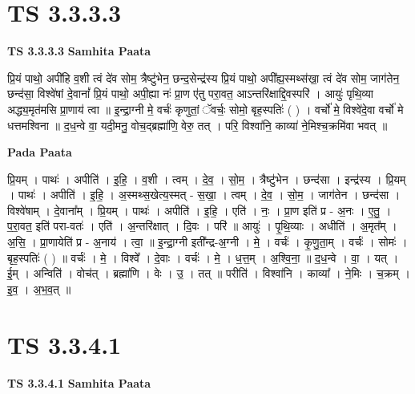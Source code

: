 \documentclass[17pt]{extarticle}
\begin{document}

\section{ TS 3.3.3.3 }

\textbf{TS 3.3.3.3 } \newline
\textbf{Samhita Paata} \newline

प्रि॒यं पाथो॒ अपी॑हि व॒शी त्वं दे॑व सोम॒ त्रैष्टु॑भेन॒ छन्द॒सेन्द्र॑स्य प्रि॒यं पाथो॒ अपी᳚ह्य॒स्मथ्स॑खा॒ त्वं दे॑व सोम॒ जाग॑तेन॒ छन्द॑सा॒ विश्वे॑षां दे॒वानां᳚ प्रि॒यं पाथो॒ अपी॒ह्या नः॑ प्रा॒ण ए॑तु परा॒वत॒ आऽन्तरि॑क्षाद्दि॒वस्परि॑ । आयुः॑ पृथि॒व्या अद्ध्य॒मृत॑मसि प्रा॒णाय॑ त्वा ॥ इ॒न्द्रा॒ग्नी मे॒ वर्चः॑ कृणुतां॒ ॅवर्चः॒ सोमो॒ बृह॒स्पतिः॑ ( ) । वर्चो॑ मे॒ विश्वे॑दे॒वा वर्चो॑ मे धत्तमश्विना ॥ द॒ध॒न्वे वा॒ यदी॒मनु॒ वोच॒द्ब्रह्मा॑णि॒ वेरु॒ तत् । परि॒ विश्वा॑नि॒ काव्या॑ ने॒मिश्च॒क्रमि॑वा भवत् ॥ \newline

\textbf{Pada Paata} \newline

प्रि॒यम् । पाथः॑ । अपीति॑ । इ॒हि॒ । व॒शी । त्वम् । दे॒व॒ । सो॒म॒ । त्रैष्टु॑भेन । छन्द॑सा । इन्द्र॑स्य । प्रि॒यम् । पाथः॑ । अपीति॑ । इ॒हि॒ । अ॒स्मथ्स॒खेत्य॒स्मत् - स॒खा॒ । त्वम् । दे॒व॒ । सो॒म॒ । जाग॑तेन । छन्द॑सा । विश्वे॑षाम् । दे॒वाना᳚म् । प्रि॒यम् । पाथः॑ । अपीति॑ । इ॒हि॒ । एति॑ । नः॒ । प्रा॒ण इति॑ प्र - अ॒नः । ए॒तु॒ । प॒रा॒वत॒ इति॑ परा-वतः॑ । एति॑ । अ॒न्तरि॑क्षात् । दि॒वः । परि॑ ॥ आयुः॑ । पृ॒थि॒व्याः । अधीति॑ । अ॒मृत᳚म् । अ॒सि॒ । प्रा॒णायेति॑ प्र - अ॒नाय॑ । त्वा॒ ॥ इ॒न्द्रा॒ग्नी इती᳚न्द्र-अ॒ग्नी । मे॒ । वर्चः॑ । कृ॒णु॒ता॒म् । वर्चः॑ । सोमः॑ । बृह॒स्पतिः॑ ( ) ॥ वर्चः॑ । मे॒ । विश्वे᳚ । दे॒वाः । वर्चः॑ । मे॒ । ध॒त्त॒म् । अ॒श्वि॒ना॒ ॥ द॒ध॒न्वे । वा॒ । यत् । ई॒म् । अन्विति॑ । वोच॑त् । ब्रह्मा॑णि । वेः । उ॒ । तत् ॥ परीति॑ । विश्वा॑नि । काव्या᳚ । ने॒मिः । च॒क्रम् । इ॒व॒ । अ॒भ॒व॒त् ॥  \newline





\section{ TS 3.3.4.1 }

\textbf{TS 3.3.4.1 } \newline
\textbf{Samhita Paata} \newline
\end{document}
